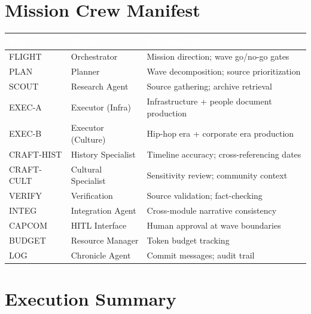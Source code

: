 \documentclass[11pt,letterpaper]{article}
\newcommand{\tableheader}[1]{\textbf{\sffamily\textcolor{white}{#1}}}
\begin{document}
\section{Mission Crew Manifest}

\begin{center}
\begin{tabularx}{\textwidth}{L{2cm}L{2.5cm}X}
\toprule
{}
\tableheader{Role} & \tableheader{Agent} & \tableheader{Responsibility} \\
\midrule
FLIGHT & Orchestrator & Mission direction; wave go/no-go gates \\
PLAN & Planner & Wave decomposition; source prioritization \\
SCOUT & Research Agent & Source gathering; archive retrieval \\
EXEC-A & Executor (Infra) & Infrastructure + people document production \\
EXEC-B & Executor (Culture) & Hip-hop era + corporate era production \\
CRAFT-HIST & History Specialist & Timeline accuracy; cross-referencing dates \\
CRAFT-CULT & Cultural Specialist & Sensitivity review; community context \\
VERIFY & Verification & Source validation; fact-checking \\
INTEG & Integration Agent & Cross-module narrative consistency \\
CAPCOM & HITL Interface & Human approval at wave boundaries \\
BUDGET & Resource Manager & Token budget tracking \\
LOG & Chronicle Agent & Commit messages; audit trail \\
\bottomrule
\end{tabularx}
\end{center}

\section{Execution Summary}
\end{document}
